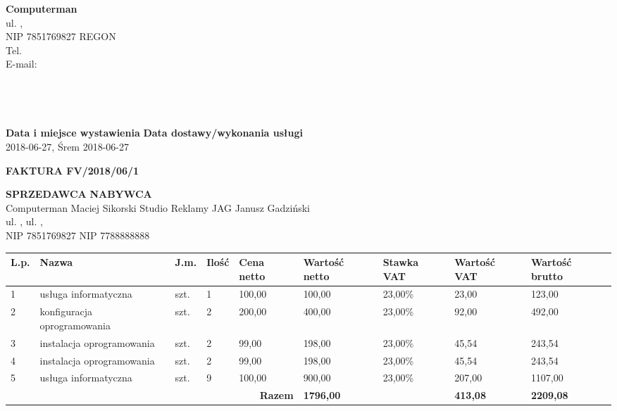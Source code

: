 \documentclass[a4paper,10pt]{article}
\date{}
\begin{document}
    \noindent
    \textbf{Computerman}\\
    ul.  ,  \\
    NIP 7851769827 REGON \\
    Tel. \\
    E-mail: \\
    \\
    \\
    
    \\
    \\
  
\noindent
    \textbf{Data i miejsce wystawienia}		\hfill \textbf{Data dostawy/wykonania usługi}\\
    2018-06-27, Śrem							        \hfill	2018-06-27\\
  
    \begin{center}
    \textbf{\huge{FAKTURA FV/2018/06/1}}
    \end{center}
    \vspace{2cm}
  
    \noindent
    \textbf{SPRZEDAWCA}						\hfill \textbf{NABYWCA}\\
    Computerman Maciej Sikorski					                        \hfill Studio Reklamy JAG Janusz Gadziński\\
    ul.  ,  								            \hfill ul.  ,  \\
    NIP 7851769827								        \hfill NIP 7788888888\\
  
    \begin{table}[H]
    \raggedleft
    \begin{tabular}{| p{} | p{}  | p{} | p{}| p{} | p{} | p{} | p{} | p{} |}
    \hline
    \textbf{L.p.} & \textbf{Nazwa} & \textbf{J.m.} & \textbf{Ilość} & \textbf{Cena netto} & \textbf{Wartość netto} & \textbf{Stawka VAT} & \textbf{Wartość VAT} & \textbf{Wartość brutto} \\ \hline
  
    1 & usługa informatyczna & szt. & 1 & 100,00 & 100,00 & 23,00\% & 23,00 & 123,00 \\ \hline
  
    2 & konfiguracja oprogramowania & szt. & 2 & 200,00 & 400,00 & 23,00\% & 92,00 & 492,00 \\ \hline
  
    3 & instalacja oprogramowania & szt. & 2 & 99,00 & 198,00 & 23,00\% & 45,54 & 243,54 \\ \hline
  
    4 & instalacja oprogramowania & szt. & 2 & 99,00 & 198,00 & 23,00\% & 45,54 & 243,54 \\ \hline
  
    5 & usługa informatyczna & szt. & 9 & 100,00 & 900,00 & 23,00\% & 207,00 & 1107,00 \\ \hline
  
    \hline
    \multicolumn{5}{|r|}{\textbf{Razem}} & \textbf{1796,00} & \cellcolor[gray]{0.9} & \textbf{413,08} & \textbf{2209,08} \\ \hline
    \end{tabular}
    \end{table}
  
\end{document}
